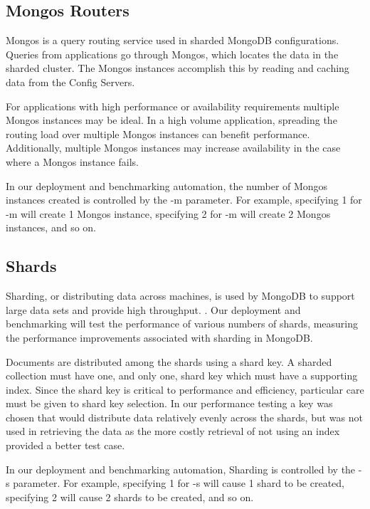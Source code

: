 \documentclass[9pt,twocolumn,twoside]{styles/osajnl}
\begin{document}
\subsection{Mongos Routers}

Mongos is a query routing service used in sharded MongoDB configurations.  Queries from applications go through Mongos, which locates the data in the sharded cluster. The Mongos instances accomplish this by reading and caching data from the Config Servers. \cite{www-mongoMongos} 

For applications with high performance or availability requirements multiple Mongos instances may be ideal.  In a high volume application, spreading the routing load over multiple Mongos instances can benefit performance.  Additionally, multiple Mongos instances may increase availability in the case where a Mongos instance fails. \cite{www-mongoConfig}

In our deployment and benchmarking automation, the number of Mongos instances created is controlled by the -m parameter.  For example, specifying 1 for -m will create 1 Mongos instance, specifying 2 for -m will create 2 Mongos instances, and so on. 


\subsection{Shards}

Sharding, or distributing data across machines, is used by MongoDB to support large data sets and provide high throughput. \cite{www-sharding}.  Our deployment and benchmarking will test the performance of various numbers of shards, measuring the performance improvements associated with sharding in MongoDB.

Documents are distributed among the shards using a shard key.  A sharded collection must have one, and only one, shard key which must have a supporting index. \cite{www-sharding}  Since the shard key is critical to performance and efficiency, particular care must be given to shard key selection. \cite{www-shardkey} In our performance testing a key was chosen that would distribute data relatively evenly across the shards, but was not used in retrieving the data as the more costly retrieval of not using an index provided a better test case.

In our deployment and benchmarking automation, Sharding is controlled by the -s parameter.  For example, specifying 1 for -s will cause 1 shard to be created, specifying 2 will cause 2 shards to be created, and so on.
\end{document}
